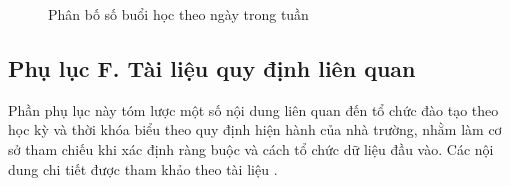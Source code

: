 \documentclass[a4paper,12pt,oneside]{article}
\begin{document}
	\begin{figure}[H]
		\centering
		\caption{Phân bố số buổi học theo ngày trong tuần}
	\end{figure}
	
	\subsection*{Phụ lục F. Tài liệu quy định liên quan}
	
	Phần phụ lục này tóm lược một số nội dung liên quan đến tổ chức đào tạo theo học kỳ và thời khóa biểu theo quy định hiện hành của nhà trường, nhằm làm cơ sở tham chiếu khi xác định ràng buộc và cách tổ chức dữ liệu đầu vào. Các nội dung chi tiết được tham khảo theo tài liệu \cite{phenikaa2023quyche}.
	
\end{document}
